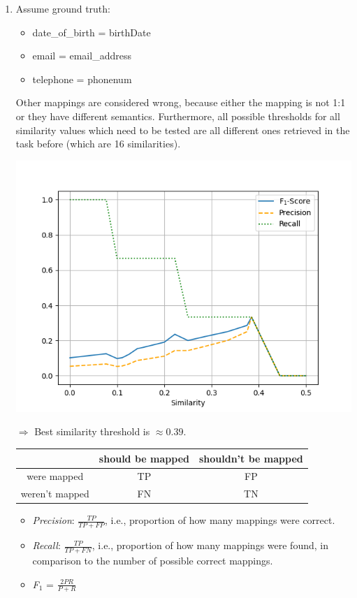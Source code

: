 \documentclass{scrartcl}
\begin{document}
\begin{enumerate}
		\item Assume ground truth:
		\begin{itemize}
			\item date\_of\_birth = birthDate
			\item email = email\_address
			\item telephone = phonenum
		\end{itemize}
		Other mappings are considered wrong, because either the mapping is not 1:1 or they have different semantics.
		Furthermore, all possible thresholds for all similarity values which need to be tested are all different ones retrieved in the task before (which are 16 similarities).
		\begin{center}
			\hspace*{-2.5cm}
			\includegraphics[width=1.25\textwidth]{figures/3d_x.png}
		\end{center}
		$\Rightarrow$ Best similarity threshold is $\approx0.39$.
		\begin{center}
			\begin{tabular}{c|c|c}
				& should be mapped & shouldn't be mapped\\\hline
				were mapped & TP & FP\\\hline
				weren't mapped & FN & TN\\
			\end{tabular}
		\end{center}
		\begin{itemize}
			\item\textit{Precision}: $\frac{TP}{TP + FP}$, i.e., proportion of how many mappings were correct.
			\item\textit{Recall}: $\frac{TP}{TP + FN}$, i.e., proportion of how many mappings were found, in comparison to the number of possible correct mappings.
			\item \textit{F$_1$} = $\frac{2PR}{P+R}$
		\end{itemize}
	

\end{enumerate}
\end{document}
